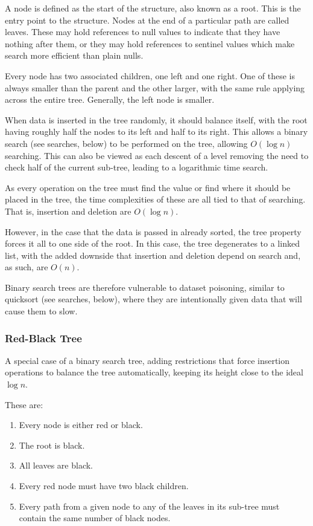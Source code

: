 \documentclass[]{article}
\begin{document}
A node is defined as the start of the structure, also known as a root. This is the entry point to the structure. Nodes at the end of a particular path are called leaves. These may hold references to null values to indicate that they have nothing after them, or they may hold references to sentinel values which make search more efficient than plain nulls.

Every node has two associated children, one left and one right. One of these is always smaller than the parent and the other larger, with the same rule applying across the entire tree. Generally, the left node is smaller.

When data is inserted in the tree randomly, it should balance itself, with the root having roughly half the nodes to its left and half to its right. This allows a binary search (see searches, below) to be performed on the tree, allowing $O(\log{n})$ searching. This can also be viewed as each descent of a level removing the need to check half of the current sub-tree, leading to a logarithmic time search.

As every operation on the tree must find the value or find where it should be placed in the tree, the time complexities of these are all tied to that of searching. That is, insertion and deletion are $O(\log{n})$.

However, in the case that the data is passed in already sorted, the tree property forces it all to one side of the root. In this case, the tree degenerates to a linked list, with the added downside that insertion and deletion depend on search and, as such, are $O(n)$.

Binary search trees are therefore vulnerable to dataset poisoning, similar to quicksort (see searches, below), where they are intentionally given data that will cause them to slow.

\subsubsection{Red-Black Tree}

A special case of a binary search tree, adding restrictions that force insertion operations to balance the tree automatically, keeping its height close to the ideal $\log{n}$.

These are:

\begin{enumerate}
	\item Every node is either red or black.
	\item The root is black.
	\item All leaves are black. 
	\item Every red node must have two black children.
	\item Every path from a given node to any of the leaves in its sub-tree must contain the same number of black nodes.
\end{enumerate}
\end{document}
